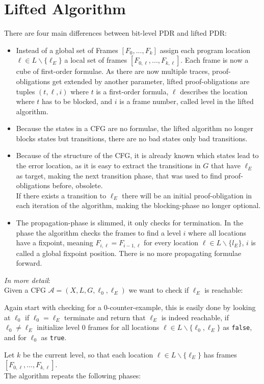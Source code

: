 \documentclass[11pt, a4paper, BCOR=10mm, ngerman]{scrbook}
\begin{document}
\section{Lifted Algorithm}
There are four main differences between bit-level PDR and lifted PDR:
\begin{itemize}

\item Instead of a global set of Frames $[F_0, ..., F_k]$ assign each program location $\ell \in L \backslash \{\ell_E\}$ a local set of frames $[F_{0, \ell}, ..., F_{k, \ell}]$. Each frame is now a cube of first-order formulae. As there are now multiple traces, proof-obligations get extended by another parameter, lifted proof-obligations are tuples $(t, \ell, i)$ where $t$ is a first-order formula, $\ell$ describes the location where $t$ has to be blocked, and $i$ is a frame number, called level in the lifted algorithm.

\item 
Because the states in a CFG are no formulae, the lifted algorithm no longer blocks states but transitions, there are no bad states only bad transitions.

\item Because of the structure of the CFG, it is already known which states lead to the error location, as it is easy to extract the transitions in $G$ that have $\ell_E$ as target, making the next transition phase, that was used to find proof-obligations before, obsolete. \\ If there exists a transition to $\ell_E$ there will be an initial proof-obligation in each iteration of the algorithm, making the blocking-phase no longer optional.

\item The propagation-phase is slimmed, it only checks for termination. In the phase the algorithm checks the frames to find a level $i$ where all locations have a fixpoint, meaning  $F_{i, \ell} = F_{i-1, \ell}$ for every location $\ell \in L \backslash \{l_E \}$, $i$ is called a global fixpoint position. There is no more propagating formulae forward.
\end{itemize}

\hspace*{5cm}

\textsl{In more detail}: \\
Given a CFG $\mathcal{A} = (X, L, G, \ell_0, \ell_E)$ we want to check if $\ell_E$ is reachable: \par
Again start with checking for a 0-counter-example, this is easily done by looking at $\ell_0$ if $\ell_0 = \ell_E$ terminate and return that $\ell_E$ is indeed reachable, if $\ell_0 \neq \ell_E$ initialize level 0 frames for all locations $\ell \in L \backslash \{\ell_0, \ell_E\}$ as \texttt{false}, and for $\ell_0$ as \texttt{true}. \par
Let $k$ be the current level, so that each location $\ell \in L \backslash \{\ell_E\}$ has frames $[F_{0, \ell}, ..., F_{k, \ell}]$. \\
The algorithm repeats the following phases: \\
\end{document}
